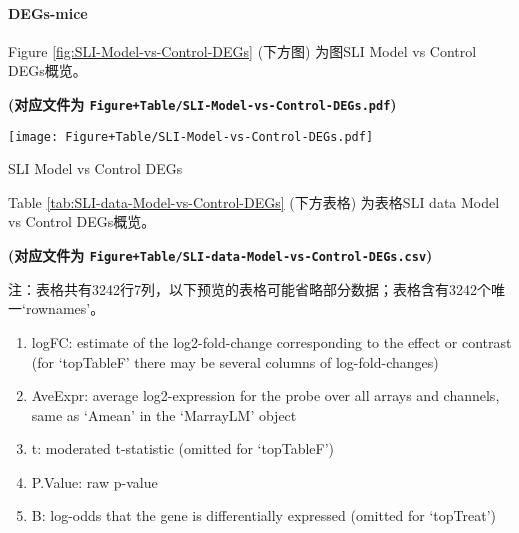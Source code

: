 \documentclass[
]{article}
\providecommand{\tightlist}{%
  \setlength{\itemsep}{0pt}\setlength{\parskip}{0pt}}
\begin{document}
\hypertarget{degs-mice}{%
\paragraph{DEGs-mice}\label{degs-mice}}

Figure \ref{fig:SLI-Model-vs-Control-DEGs} (下方图) 为图SLI Model vs Control DEGs概览。

\textbf{(对应文件为 \texttt{Figure+Table/SLI-Model-vs-Control-DEGs.pdf})}

\def\@captype{figure}
\begin{center}
\texttt{[image: Figure+Table/SLI-Model-vs-Control-DEGs.pdf]}
\caption{SLI Model vs Control DEGs}\label{fig:SLI-Model-vs-Control-DEGs}
\end{center}

Table \ref{tab:SLI-data-Model-vs-Control-DEGs} (下方表格) 为表格SLI data Model vs Control DEGs概览。

\textbf{(对应文件为 \texttt{Figure+Table/SLI-data-Model-vs-Control-DEGs.csv})}

\begin{center}\begin{tcolorbox}[colback=gray!10, colframe=gray!50, width=0.9\linewidth, arc=1mm, boxrule=0.5pt]注：表格共有3242行7列，以下预览的表格可能省略部分数据；表格含有3242个唯一`rownames'。
\end{tcolorbox}
\end{center}
\begin{center}\begin{tcolorbox}[colback=gray!10, colframe=gray!50, width=0.9\linewidth, arc=1mm, boxrule=0.5pt]\begin{enumerate}\tightlist
\item logFC:  estimate of the log2-fold-change corresponding to the effect or contrast (for ‘topTableF’ there may be several columns of log-fold-changes)
\item AveExpr:  average log2-expression for the probe over all arrays and channels, same as ‘Amean’ in the ‘MarrayLM’ object
\item t:  moderated t-statistic (omitted for ‘topTableF’)
\item P.Value:  raw p-value
\item B:  log-odds that the gene is differentially expressed (omitted for ‘topTreat’)
\end{enumerate}\end{tcolorbox}
\end{center}
\end{document}
